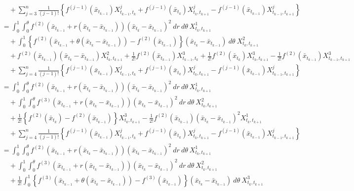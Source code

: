 \begin{prf}
\begin{align}
				&\quad + \sum_{j=3}^n \frac{1}{(j-1)!} \left\{ f^{(j-1)}(\bar{x}_{t_{k-1}})X^j_{t_{k-1},t_k} + f^{(j-1)}(\bar{x}_{t_k})X^j_{t_k,t_{k+1}} - f^{(j-1)}(\bar{x}_{t_{k-1}})X^j_{t_{k-1},t_{k+1}} \right\} \\
			&= \int_0^1 \int_0^{\theta} f^{(2)}(\bar{x}_{t_{k-1}} + r(\bar{x}_{t_k} - \bar{x}_{t_{k-1}}))(\bar{x}_{t_k} - \bar{x}_{t_{k-1}})^2\ dr\ d\theta\ X^1_{t_k,t_{k+1}} \\
				&\quad + \int_0^1 \left\{ f^{(2)}(\bar{x}_{t_{k-1}} + \theta(\bar{x}_{t_k}-\bar{x}_{t_{k-1}})) - f^{(2)}(\bar{x}_{t_{k-1}}) \right\}(\bar{x}_{t_k}-\bar{x}_{t_{k-1}})\ d\theta\ X^2_{t_k,t_{k+1}} \\
				&\quad + f^{(2)}(\bar{x}_{t_{k-1}}) (\bar{x}_{t_k}-\bar{x}_{t_{k-1}}) X^2_{t_k,t_{k+1}}
					+ \frac{1}{2!} f^{(2)}(\bar{x}_{t_{k-1}})X^3_{t_{k-1},t_k} + \frac{1}{2!} f^{(2)}(\bar{x}_{t_k})X^3_{t_k,t_{k+1}} - \frac{1}{2!} f^{(2)}(\bar{x}_{t_{k-1}})X^3_{t_{k-1},t_{k+1}} \\
				&\quad + \sum_{j=4}^n \frac{1}{(j-1)!} \left\{ f^{(j-1)}(\bar{x}_{t_{k-1}})X^j_{t_{k-1},t_k} + f^{(j-1)}(\bar{x}_{t_k})X^j_{t_k,t_{k+1}} - f^{(j-1)}(\bar{x}_{t_{k-1}})X^j_{t_{k-1},t_{k+1}} \right\} \\
			&= \int_0^1 \int_0^{\theta} f^{(2)}(\bar{x}_{t_{k-1}} + r(\bar{x}_{t_k} - \bar{x}_{t_{k-1}}))(\bar{x}_{t_k} - \bar{x}_{t_{k-1}})^2\ dr\ d\theta\ X^1_{t_k,t_{k+1}} \\
				&\quad + \int_0^1 \int_0^\theta f^{(3)}(\bar{x}_{t_{k-1}} + r(\bar{x}_{t_k}-\bar{x}_{t_{k-1}}))(\bar{x}_{t_k}-\bar{x}_{t_{k-1}})^2\ dr\ d\theta\ X^2_{t_k,t_{k+1}} \\
				&\quad + \frac{1}{2!}\left\{ f^{(2)}(\bar{x}_{t_k}) - f^{(2)}(\bar{x}_{t_{k-1}}) \right\} X^3_{t_k,t_{k+1}}
					- \frac{1}{2!} f^{(2)}(\bar{x}_{t_{k-1}}) (\bar{x}_{t_k}-\bar{x}_{t_{k-1}})^2X^1_{t_k,t_{k+1}} \\
				&\quad + \sum_{j=4}^n \frac{1}{(j-1)!} \left\{ f^{(j-1)}(\bar{x}_{t_{k-1}})X^j_{t_{k-1},t_k} + f^{(j-1)}(\bar{x}_{t_k})X^j_{t_k,t_{k+1}} - f^{(j-1)}(\bar{x}_{t_{k-1}})X^j_{t_{k-1},t_{k+1}} \right\} \\
			&= \int_0^1 \int_0^{\theta} f^{(2)}(\bar{x}_{t_{k-1}} + r(\bar{x}_{t_k} - \bar{x}_{t_{k-1}}))(\bar{x}_{t_k} - \bar{x}_{t_{k-1}})^2\ dr\ d\theta\ X^1_{t_k,t_{k+1}} \\
				&\quad + \int_0^1 \int_0^\theta f^{(3)}(\bar{x}_{t_{k-1}} + r(\bar{x}_{t_k}-\bar{x}_{t_{k-1}}))(\bar{x}_{t_k}-\bar{x}_{t_{k-1}})^2\ dr\ d\theta\ X^2_{t_k,t_{k+1}} \\
				&\quad + \frac{1}{2!} \int_0^1 \left\{ f^{(3)}(\bar{x}_{t_{k-1}} + \theta(\bar{x}_{t_k}-\bar{x}_{t_{k-1}})) - f^{(3)}(\bar{x}_{t_{k-1}}) \right\}(\bar{x}_{t_k}-\bar{x}_{t_{k-1}})\ d\theta\ X^3_{t_k,t_{k+1}}

\end{align}
\end{prf}
